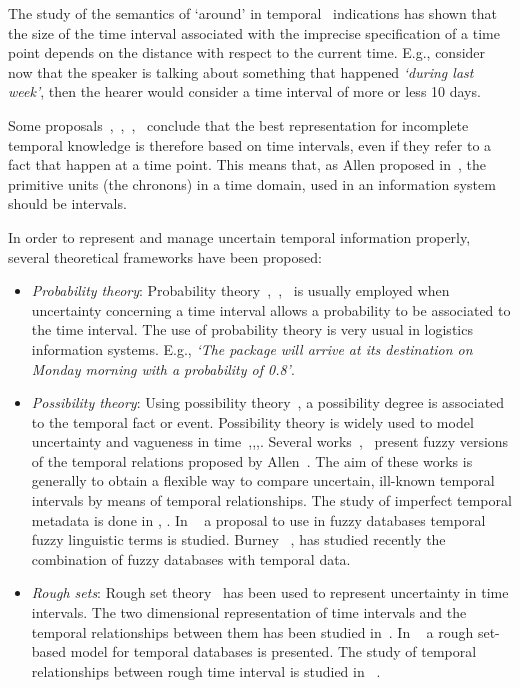 The study of the semantics of `around' in temporal~\cite{Dev98} indications has shown that the size of the time interval associated with the imprecise specification of a time point depends on the distance with respect to the current time. E.g., consider now that the speaker is talking about something that happened \emph{`during last week'}, then the hearer would consider a time interval of more or less 10 days. 


Some proposals~\cite{knight1993},~\cite{Cru97},~\cite{nagypal2003},~\cite{Chountas2000} conclude that the best representation for incomplete temporal knowledge is therefore based on time intervals, even if they refer to a fact that happen at a time point. This means that, as Allen proposed in~\cite{Allen83}, the primitive units (the chronons) in a time domain, used in an information system should be intervals.

In order to represent and manage uncertain temporal information properly, several theoretical frameworks have been proposed:

\begin{itemize}
\item \emph{Probability theory}:
Probability theory~\cite{Dey1996},~\cite{Lakshmanan1997},~\cite{Haddawy1996} is usually employed when uncertainty concerning a time interval allows a probability to be associated to the time interval. The use of probability theory is very usual in logistics information systems. E.g., \emph{`The package will arrive at its destination on Monday morning with a probability of 0.8'}.



\item \emph{Possibility theory}:
Using possibility theory~\cite{DidierDubois1988a}, a possibility degree is associated to the temporal fact or event. Possibility theory is widely used to model uncertainty and vagueness in time~\cite{Dubois:jucs_9_9:fuzziness_and_uncertainty_in},\cite{Dubois89},\cite{devos94},\cite{nagypal2003}. Several works~\cite{schockaert08},~\cite{ohlbach2004} present fuzzy versions of the temporal relations proposed by Allen~\cite{Allen83}. The aim of these works is generally to obtain a flexible way to compare uncertain, ill-known temporal intervals by means of temporal relationships. The study of imperfect temporal metadata is done in \cite{Bordogna2009}, \cite{Bordogna2011}. In ~\cite{Soysangwarn2009} a proposal to use in fuzzy databases temporal fuzzy linguistic terms is studied. Burney ~\cite{burney2010a}, \cite{burney2010b} has studied recently the combination of fuzzy databases with temporal data.


\item \emph{Rough sets}:
Rough set theory~\cite{Pawlak1995} has been used to represent uncertainty in time intervals. The two dimensional representation of time intervals and the temporal relationships between them has been studied in~\cite{Qia09}. In ~\cite{Burney2009} a rough set-based model for temporal databases is presented. The study of temporal relationships between rough time interval is studied in ~\cite{Bassiri2009}.
\end{itemize}



